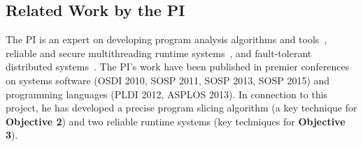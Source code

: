 % 


\vspace{-.15in}\subsection{Related Work by the PI} 
\label{sec:my-work}\vspace{-.075in}
% 

The PI is an expert on developing program analysis algorithms and 
tools~\cite{wu:pldi12, woodpecker:asplos13, repframe:apsys15}, reliable and 
secure multithreading runtime systems~\cite{smt:cacm, cui:tern:osdi10, 
peregrine:sosp11, parrot:sosp13}, and fault-tolerant distributed 
systems~\cite{crane:sosp15}. The PI's work have been published in 
premier conferences on systems software (OSDI 2010, SOSP 2011, SOSP 2013, SOSP 
2015) and programming languages (PLDI 2012, ASPLOS 2013). In connection to 
this project, he has developed a precise program slicing algorithm (a key 
technique for \textbf{Objective 2}) and two reliable runtime systems (key 
techniques for \textbf{Objective 3}).


